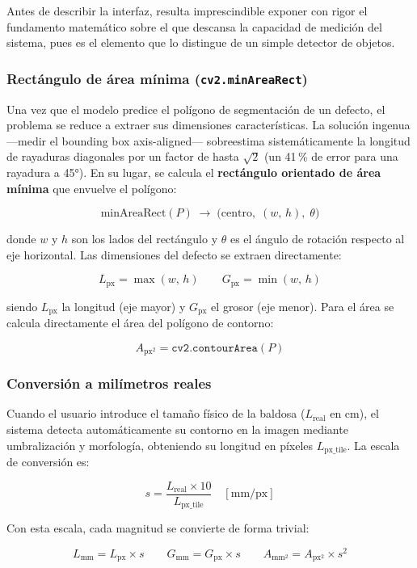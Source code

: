 \documentclass[12pt,a4paper]{article}
\begin{document}
Antes de describir la interfaz, resulta imprescindible exponer con rigor el fundamento
matemático sobre el que descansa la capacidad de medición del sistema, pues es el
elemento que lo distingue de un simple detector de objetos.

\subsubsection{Rectángulo de área mínima (\texttt{cv2.minAreaRect})}

Una vez que el modelo predice el polígono de segmentación de un defecto, el problema
se reduce a extraer sus dimensiones características. La solución ingenua —medir el
bounding box axis-aligned— sobreestima sistemáticamente la longitud de rayaduras
diagonales por un factor de hasta $\sqrt{2}$ (un 41\,\% de error para una rayadura
a 45°). En su lugar, se calcula el \textbf{rectángulo orientado de área mínima} que
envuelve el polígono:

\[
  \text{minAreaRect}(P) \;\longrightarrow\; \bigl(\text{centro},\; (w,\, h),\; \theta\bigr)
\]

donde $w$ y $h$ son los lados del rectángulo y $\theta$ es el ángulo de rotación
respecto al eje horizontal. Las dimensiones del defecto se extraen directamente:

\[
  \boxed{L_{\text{px}} = \max(w,\, h)} \qquad \boxed{G_{\text{px}} = \min(w,\, h)}
\]

siendo $L_{\text{px}}$ la longitud (eje mayor) y $G_{\text{px}}$ el grosor (eje menor).
Para el área se calcula directamente el área del polígono de contorno:

\[
  A_{\text{px}^2} = \texttt{cv2.contourArea}(P)
\]

\subsubsection{Conversión a milímetros reales}

Cuando el usuario introduce el tamaño físico de la baldosa ($L_{\text{real}}$ en cm),
el sistema detecta automáticamente su contorno en la imagen mediante umbralización
y morfología, obteniendo su longitud en píxeles $L_{\text{px\_tile}}$. La escala de
conversión es:

\[
  \boxed{s = \frac{L_{\text{real}} \times 10}{L_{\text{px\_tile}}} \quad [\text{mm/px}]}
\]

Con esta escala, cada magnitud se convierte de forma trivial:

\[
  L_{\text{mm}} = L_{\text{px}} \times s \qquad
  G_{\text{mm}} = G_{\text{px}} \times s \qquad
  A_{\text{mm}^2} = A_{\text{px}^2} \times s^2
\]
\end{document}
